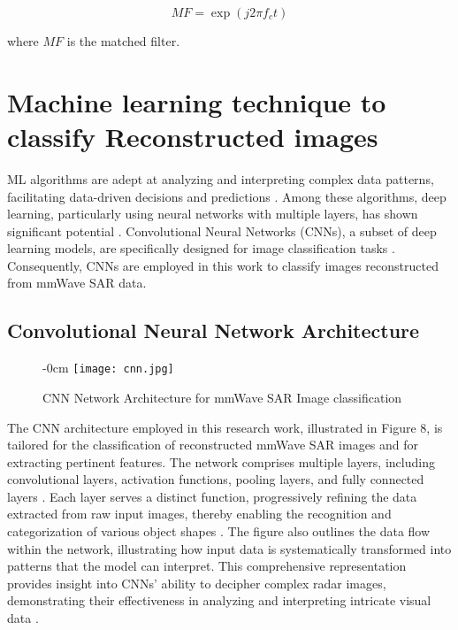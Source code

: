 \documentclass[journal,article,submit,pdftex,moreauthors]{Definitions/mdpi}
\begin{document}
\begin{equation}
 MF = \exp(j 2\pi f_c t)
\end{equation}

\noindent where \(MF\) is the matched filter. 

\section{Machine learning technique to classify Reconstructed images}

ML algorithms are adept at analyzing and interpreting complex data patterns, facilitating data-driven decisions and predictions \cite{hastie2009elements, murphy2012machine}. Among these algorithms, deep learning, particularly using neural networks with multiple layers, has shown significant potential \cite{lecun2015deep}. Convolutional Neural Networks (CNNs), a subset of deep learning models, are specifically designed for image classification tasks \cite{krizhevsky2012imagenet}. Consequently, CNNs are employed in this work to classify images reconstructed from mmWave SAR data.

\subsection{Convolutional Neural Network Architecture}


\begin{figure}[H]
\begin{adjustwidth}{-\extralength}{0cm}
\centering
\texttt{[image: cnn.jpg]}
\end{adjustwidth}
\caption{CNN Network Architecture for mmWave SAR Image classification\label{}}
\end{figure}  


The CNN architecture employed in this research work, illustrated in Figure 8, is tailored for the classification of reconstructed mmWave SAR images and for extracting pertinent features. The network comprises multiple layers, including convolutional layers, activation functions, pooling layers, and fully connected layers \cite{simonyan2014very}. Each layer serves a distinct function, progressively refining the data extracted from raw input images, thereby enabling the recognition and categorization of various object shapes \cite{zeiler2014visualizing}. The figure also outlines the data flow within the network, illustrating how input data is systematically transformed into patterns that the model can interpret. This comprehensive representation provides insight into CNNs' ability to decipher complex radar images, demonstrating their effectiveness in analyzing and interpreting intricate visual data \cite{goodfellow2016deep}.
\end{document}
